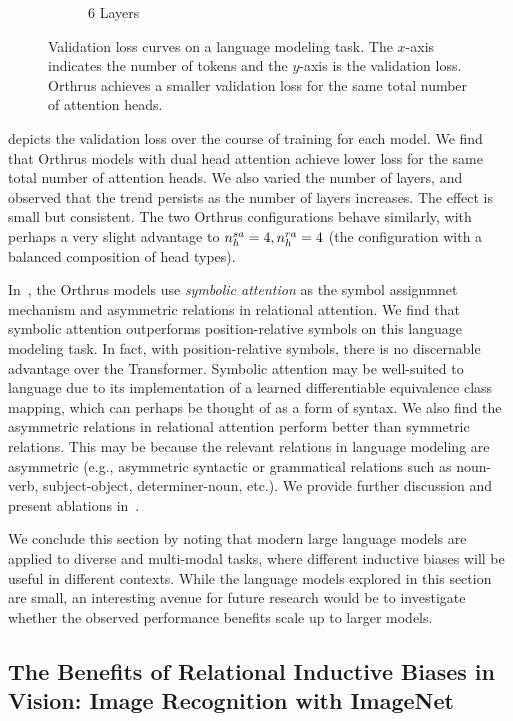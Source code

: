 \begin{figure}[ht]
\begin{subfigure}{0.33\textwidth}
        \caption{6 Layers}
    \end{subfigure}
    \caption{Validation loss curves on a language modeling task. The $x$-axis indicates the number of tokens and the $y$-axis is the validation loss. Orthrus achieves a smaller validation loss for the same total number of attention heads.}\label{fig:tiny_stories_val_loss_curves}
\end{figure}

 depicts the validation loss over the course of training for each model. We find that Orthrus models with dual head attention achieve lower loss for the same total number of attention heads. We also varied the number of layers, and observed that the trend persists as the number of layers increases. The effect is small but consistent. The two Orthrus configurations behave similarly, with perhaps a very slight advantage to $n_h^{sa} = 4, n_h^{ra} = 4$ (the configuration with a balanced composition of head types).

In~, the Orthrus models use \textit{symbolic attention} as the symbol assignmnet mechanism and asymmetric relations in relational attention. We find that symbolic attention outperforms position-relative symbols on this language modeling task. In fact, with position-relative symbols, there is no discernable advantage over the Transformer. Symbolic attention may be well-suited to language due to its implementation of a learned differentiable equivalence class mapping, which can perhaps be thought of as a form of syntax. We also find the asymmetric relations in relational attention perform better than symmetric relations. This may be because the relevant relations in language modeling are asymmetric (e.g., asymmetric syntactic or grammatical relations such as noun-verb, subject-object, determiner-noun, etc.). We provide further discussion and present ablations in~.

We conclude this section by noting that modern large language models are applied to diverse and multi-modal tasks, where different inductive biases will be useful in different contexts. While the language models explored in this section are small, an interesting avenue for future research would be to investigate whether the observed performance benefits scale up to larger models.

\subsection{The Benefits of Relational Inductive Biases in Vision: Image Recognition with ImageNet}\label{ssec:imagenet}

